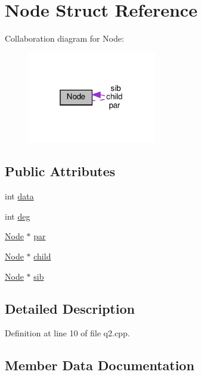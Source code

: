 \hypertarget{struct_node}{}\section{Node Struct Reference}
\label{struct_node}


Collaboration diagram for Node\+:
\nopagebreak
\begin{figure}[H]
\begin{center}
\leavevmode
\includegraphics[width=159pt]{struct_node__coll__graph}
\end{center}
\end{figure}
\subsection*{Public Attributes}
\begin{DoxyCompactItemize}
\item 
int \hyperlink{struct_node_a87c003c9f600e3fc58e6e90835f0b605}{data}
\item 
int \hyperlink{struct_node_a7e62acb60050120d8d3d5b8fb640bbcb}{deg}
\item 
\hyperlink{struct_node}{Node} $\ast$ \hyperlink{struct_node_abc9a07a65bab86d77438b34e607ba148}{par}
\item 
\hyperlink{struct_node}{Node} $\ast$ \hyperlink{struct_node_a1124b77881c051aee791e949376f82e2}{child}
\item 
\hyperlink{struct_node}{Node} $\ast$ \hyperlink{struct_node_a2df7d905421f931a2b076706e7daed1b}{sib}
\end{DoxyCompactItemize}


\subsection{Detailed Description}


Definition at line 10 of file q2.\+cpp.



\subsection{Member Data Documentation}
\mbox{\label{struct_node_a1124b77881c051aee791e949376f82e2}} 
